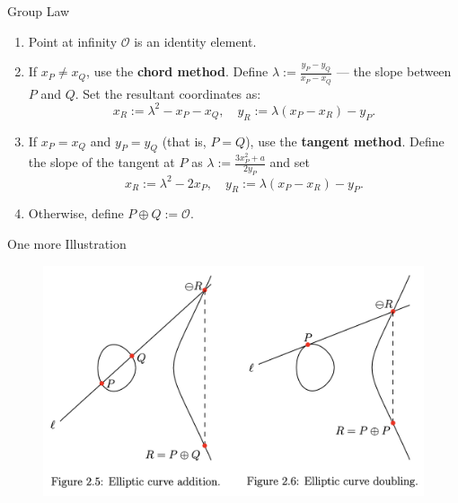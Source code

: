 \documentclass{beamer}
\begin{document}
    \begin{frame}{Group Law}
        \begin{definition}
            \begin{enumerate}
                \item Point at infinity $\mathcal{O}$ is an identity element. \pause
                \item If $x_P\neq x_Q$, use the \textbf{chord method}. Define $\lambda := \frac{y_P-y_Q}{x_P-x_Q}$ --- the slope between $P$ and $Q$. Set the resultant coordinates as:
                \begin{equation*}
                    x_R := \lambda^2 - x_P - x_Q, \quad y_R := \lambda(x_P-x_R)-y_P.
                \end{equation*} \pause
                \item If $x_P=x_Q$ and $y_P=y_Q$ (that is, $P=Q$), use the \textbf{tangent method}. Define the slope of the tangent at $P$ as $\lambda := \frac{3x_P^2+a}{2y_P}$ and set
                \begin{equation*}
                    x_R := \lambda^2 - 2x_P, \quad y_R := \lambda(x_P-x_R)-y_P.
                \end{equation*} \pause
                \item Otherwise, define $P \oplus Q := \mathcal{O}$.
            \end{enumerate}
        \end{definition}
    \end{frame}

    \begin{frame}{One more Illustration}
        \begin{figure}[H]
            \centering
            \includegraphics[width=\textwidth]{images/lecture_3/group_law.png}
            \label{fig:group_law}
        \end{figure}
    \end{frame}
\end{document}
